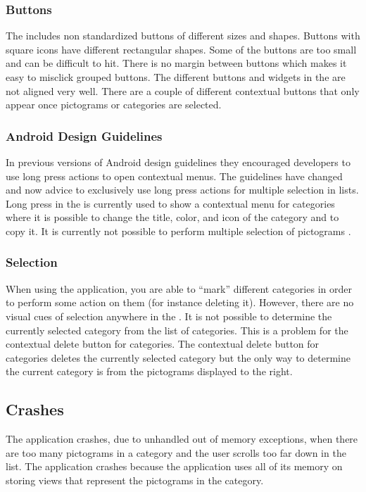 \subsubsection{Buttons}

The \ct includes non standardized buttons of different sizes and shapes. Buttons with square icons have different rectangular shapes. Some of the buttons are too small and can be difficult to hit. There is no margin between buttons which makes it easy to misclick grouped buttons. The different buttons and widgets in the \ct are not aligned very well. There are a couple of different contextual buttons that only appear once pictograms or categories are selected. 

\subsubsection{Android Design Guidelines}

In previous versions of Android design guidelines they encouraged developers to use long press actions to open contextual menus. The guidelines have changed and now advice to exclusively use long press actions for multiple selection in lists. Long press in the \ct is currently used to show a contextual menu for categories where it is possible to change the title, color, and icon of the category and to copy it. It is currently not possible to perform multiple selection of pictograms \parencite{android_guidelines_longpress}.

\subsubsection{Selection}

When using the application, you are able to ``mark'' different categories in order to perform some action on them (for instance deleting it). However, there are no visual cues of selection anywhere in the \ct.  It is not possible to determine the currently selected category from the list of categories. This is a problem for the contextual delete button for categories. The contextual delete button for categories deletes the currently selected category but the only way to determine the current category is from the pictograms displayed to the right.

\subsection{Crashes}
The application crashes, due to unhandled out of memory exceptions, when there are too many pictograms in a category and the user scrolls too far down in the list. The application crashes because the application uses all of its memory on storing views that represent the pictograms in the category. 

